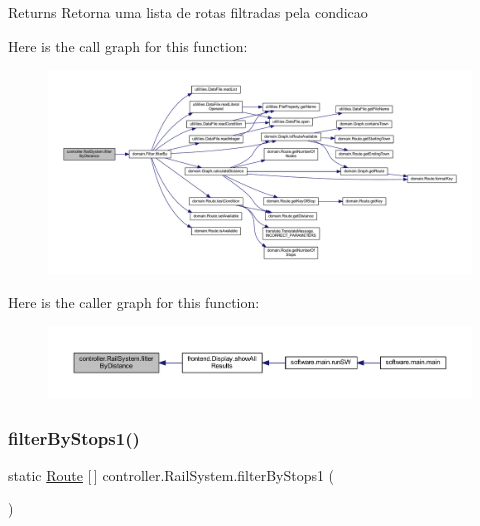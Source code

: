 \begin{DoxyReturn}{Returns}
Retorna uma lista de rotas filtradas pela condicao 
\end{DoxyReturn}
Here is the call graph for this function\+:\nopagebreak
\begin{figure}[H]
\begin{center}
\leavevmode
\includegraphics[width=350pt]{classcontroller_1_1_rail_system_af0f79e772114a04e35ee1f0a8eae66e4_cgraph}
\end{center}
\end{figure}
Here is the caller graph for this function\+:\nopagebreak
\begin{figure}[H]
\begin{center}
\leavevmode
\includegraphics[width=350pt]{classcontroller_1_1_rail_system_af0f79e772114a04e35ee1f0a8eae66e4_icgraph}
\end{center}
\end{figure}
\mbox{\label{classcontroller_1_1_rail_system_aecab2f33307d056fc39b715421705d62}} 
\subsubsection{\texorpdfstring{filter\+By\+Stops1()}{filterByStops1()}}
{\footnotesize\ttfamily static \hyperlink{classdomain_1_1_route}{Route} \mbox{[}$\,$\mbox{]} controller.\+Rail\+System.\+filter\+By\+Stops1 (\begin{DoxyParamCaption}{ }\end{DoxyParamCaption})\hspace{0.3cm}{\ttfamily [static]}}


